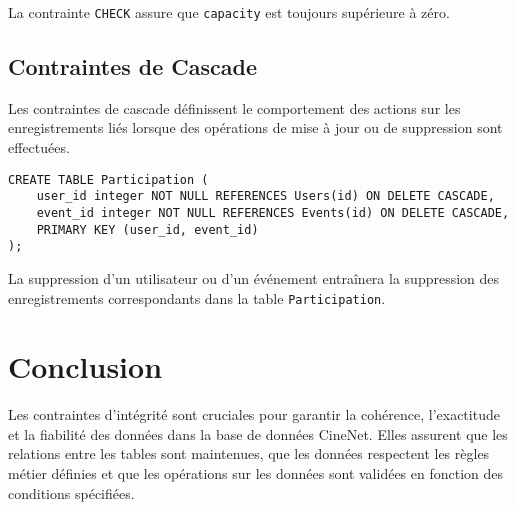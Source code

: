La contrainte \texttt{CHECK} assure que \texttt{capacity} est toujours supérieure à zéro.

\subsection*{Contraintes de Cascade}

Les contraintes de cascade définissent le comportement des actions sur les enregistrements liés lorsque des opérations de mise à jour ou de suppression sont effectuées.

\begin{lstlisting}
CREATE TABLE Participation (
    user_id integer NOT NULL REFERENCES Users(id) ON DELETE CASCADE,
    event_id integer NOT NULL REFERENCES Events(id) ON DELETE CASCADE,
    PRIMARY KEY (user_id, event_id)
);
\end{lstlisting}

La suppression d'un utilisateur ou d'un événement entraînera la suppression des enregistrements correspondants dans la table \texttt{Participation}.

\section*{Conclusion}

Les contraintes d'intégrité sont cruciales pour garantir la cohérence, l'exactitude et la fiabilité des données dans la base de données CineNet. Elles assurent que les relations entre les tables sont maintenues, que les données respectent les règles métier définies et que les opérations sur les données sont validées en fonction des conditions spécifiées.
